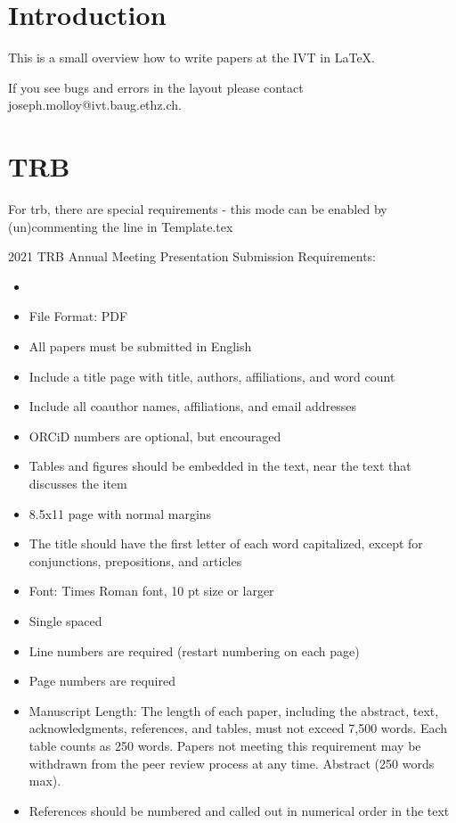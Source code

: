 %
\section{Introduction}
%

This is a small overview how to write papers at the IVT in \LaTeX.

If you see bugs and errors in the layout please contact
joseph.molloy@ivt.baug.ethz.ch.

\section{TRB}
For trb, there are special requirements - this mode can be enabled by (un)commenting the line in Template.tex

2021 TRB Annual Meeting Presentation Submission Requirements:
\begin{itemize}
    \item 
\item File Format: PDF
\item All papers must be submitted in English
\item Include a title page with title, authors, affiliations, and word count
\item Include all coauthor names, affiliations, and email addresses
\item ORCiD numbers are optional, but encouraged
\item Tables and figures should be embedded in the text, near the text that discusses the item
\item 8.5x11 page with normal margins
\item The title should have the first letter of each word capitalized, except for conjunctions, prepositions, and articles
\item Font: Times Roman font, 10 pt size or larger
\item Single spaced
\item Line numbers are required (restart numbering on each page)
\item Page numbers are required
\item Manuscript Length: The length of each paper, including the abstract, text, acknowledgments, references, and tables, must not exceed 7,500 words. Each table counts as 250 words. Papers not meeting this requirement may be withdrawn from the peer review process at any time. Abstract (250 words max). 
\item References should be numbered and called out in numerical order in the text
\end{itemize}


